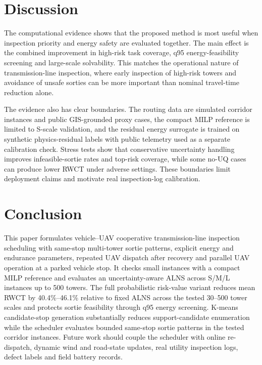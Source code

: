 \documentclass[preprint,12pt,number]{elsarticle}
\newcommand{\rev}[1]{{\color{blue}#1}}
\begin{document}
\clearpage

\section{Discussion}
\label{sec:discussion}

\rev{The computational evidence shows that the proposed method is most useful when inspection priority and energy safety are evaluated together. The main effect is the combined improvement in high-risk task coverage, q95 energy-feasibility screening and large-scale solvability. This matches the operational nature of transmission-line inspection, where early inspection of high-risk towers and avoidance of unsafe sorties can be more important than nominal travel-time reduction alone.}

\rev{The evidence also has clear boundaries. The routing data are simulated corridor instances and public GIS-grounded proxy cases, the compact MILP reference is limited to S-scale validation, and the residual energy surrogate is trained on synthetic physics-residual labels with public telemetry used as a separate calibration check. Stress tests show that conservative uncertainty handling improves infeasible-sortie rates and top-risk coverage, while some no-UQ cases can produce lower RWCT under adverse settings. These boundaries limit deployment claims and motivate real inspection-log calibration.}

\section{Conclusion}
\label{sec:conclusion}

\rev{This paper formulates vehicle--UAV cooperative transmission-line inspection scheduling with same-stop multi-tower sortie patterns, explicit energy and endurance parameters, repeated UAV dispatch after recovery and parallel UAV operation at a parked vehicle stop.} It checks small instances with a compact MILP reference and evaluates an uncertainty-aware ALNS across S/M/L instances up to 500 towers. \rev{The full probabilistic risk-value variant reduces mean RWCT by 40.4\%--46.1\% relative to fixed ALNS across the tested 30--500 tower scales and protects sortie feasibility through q95 energy screening.} K-means candidate-stop generation substantially reduces support-candidate enumeration while the scheduler evaluates bounded same-stop sortie patterns in the tested corridor instances. \rev{Future work should couple the scheduler with online re-dispatch, dynamic wind and road-state updates, real utility inspection logs, defect labels and field battery records.}
\end{document}
